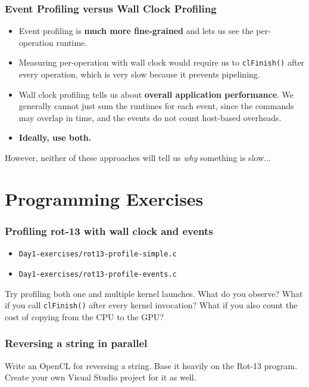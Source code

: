 \documentclass{beamer}
\begin{document}
\begin{frame}
  \frametitle{Event Profiling versus Wall Clock Profiling}

  \begin{itemize}
  \item Event profiling is \textbf{much more fine-grained} and lets us
    see the per-operation runtime.
  \item Measuring per-operation with wall clock would require us to
    \texttt{clFinish()} after every operation, which is very slow
    because it prevents pipelining.
  \item Wall clock profiling tells us about \textbf{overall
      application performance}.  We generally cannot just sum the
    runtimes for each event, since the commands may overlap in time,
    and the events do not count host-based overheads.
  \item \textbf{Ideally, use both.}
  \end{itemize}

  However, neither of these approaches will tell us \textit{why}
  something is slow...
\end{frame}

\section{Programming Exercises}

\begin{frame}
	\tableofcontents[currentsection]
\end{frame}

\begin{frame}
  \frametitle{Profiling rot-13 with wall clock and events}

  \begin{itemize}
  \item \texttt{Day1-exercises/rot13-profile-simple.c}
  \item \texttt{Day1-exercises/rot13-profile-events.c}
  \end{itemize}

  Try profiling both one and multiple kernel launches.  What do you
  observe?  What if you call \texttt{clFinish()} after every kernel
  invocation?  What if you also count the cost of copying from the CPU
  to the GPU?

\end{frame}

\begin{frame}
  \frametitle{Reversing a string in parallel}

  Write an OpenCL for reversing a string.  Base it heavily on the
  Rot-13 program.  Create your own Visual Studio project for it as
  well.
\end{frame}
\end{document}

